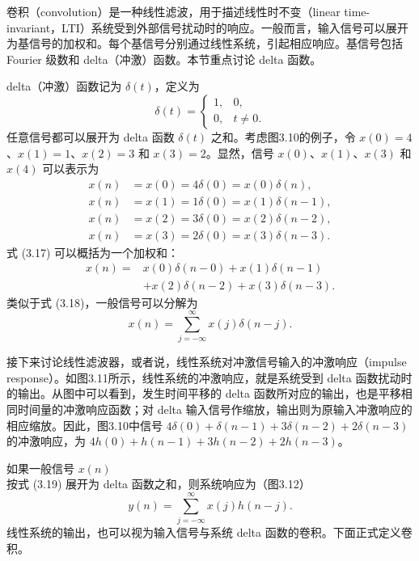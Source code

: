 卷积（convolution）是一种线性滤波，用于描述线性时不变（linear time-invariant，LTI）系统受到外部信号扰动时的响应。一般而言，输入信号可以展开为基信号的加权和。每个基信号分别通过线性系统，引起相应响应。基信号包括 Fourier 级数和 delta（冲激）函数。本节重点讨论 delta 函数。

delta（冲激）函数记为 $\delta(t)$，定义为
\begin{equation}
\delta(t)=\begin{cases}
1,&0,\\
0,&t\ne0.
\end{cases}
\tag{3.16}
\end{equation}
任意信号都可以展开为 delta 函数 $\delta(t)$ 之和。考虑图3.10的例子，令 $x(0)=4$、$x(1)=1$、$x(2)=3$ 和 $x(3)=2$。显然，信号 $x(0)$、$x(1)$、$x(3)$ 和 $x(4)$ 可以表示为
\begin{equation}
\begin{aligned}
x(n)&=x(0)=4\delta(0)=x(0)\delta(n),\\
x(n)&=x(1)=1\delta(0)=x(1)\delta(n-1),\\
x(n)&=x(2)=3\delta(0)=x(2)\delta(n-2),\\
x(n)&=x(3)=2\delta(0)=x(3)\delta(n-3).
\end{aligned}
\tag{3.17}
\end{equation}
式 (3.17) 可以概括为一个加权和：
\begin{equation}
\begin{aligned}
x(n)={}&x(0)\delta(n-0)+x(1)\delta(n-1)\\
&+x(2)\delta(n-2)+x(3)\delta(n-3).
\end{aligned}
\tag{3.18}
\end{equation}
类似于式 (3.18)，一般信号可以分解为
\begin{equation}
x(n)=\sum_{j=-\infty}^{\infty}x(j)\delta(n-j).
\tag{3.19}
\end{equation}



接下来讨论线性滤波器，或者说，线性系统对冲激信号输入的冲激响应（impulse response）。如图3.11所示，线性系统的冲激响应，就是系统受到 delta 函数扰动时的输出。从图中可以看到，发生时间平移的 delta 函数所对应的输出，也是平移相同时间量的冲激响应函数；对 delta 输入信号作缩放，输出则为原输入冲激响应的相应缩放。因此，图3.10中信号 $4\delta(0)+\delta(n-1)+3\delta(n-2)+2\delta(n-3)$ 的冲激响应，为 $4h(0)+h(n-1)+3h(n-2)+2h(n-3)$。



如果一般信号 $x(n)$ 按式 (3.19) 展开为 delta 函数之和，则系统响应为（图3.12）
\begin{equation}
y(n)=\sum_{j=-\infty}^{\infty}x(j)h(n-j).
\tag{3.20}
\end{equation}
线性系统的输出，也可以视为输入信号与系统 delta 函数的卷积。下面正式定义卷积。

